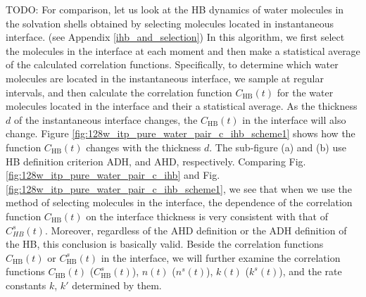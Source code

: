 TODO:
For comparison, let us look at the HB dynamics of water molecules in the solvation shells obtained by selecting molecules 
located in instantaneous interface. (see Appendix \ref{ihb_and_selection}) 
In this algorithm, we first select the molecules in the interface at each moment and then make a statistical
average of the calculated correlation functions.
Specifically, to determine which water molecules are located in the instantaneous interface, we sample at regular intervals, and then calculate 
the correlation function $C_\text{HB}(t)$ for the water molecules located in the interface and their a statistical average.
As the thickness $d$ of the instantaneous interface changes, the $C_\text{HB}(t)$ in the interface will also change. 
Figure \ref{fig:128w_itp_pure_water_pair_c_ihb_scheme1} shows how the function $C_\text{HB}(t)$ changes with the thickness $d$.
The sub-figure (a) and (b) use HB definition criterion ADH, and AHD, respectively.
Comparing Fig.\thinspace\ref{fig:128w_itp_pure_water_pair_c_ihb} and Fig.\thinspace\ref{fig:128w_itp_pure_water_pair_c_ihb_scheme1}, we see that
when we use the method of selecting molecules in the interface, the dependence of the correlation function $C_\text{HB}(t)$  
on the interface thickness is very consistent with that of $C^s_{HB}(t)$. Moreover, regardless of the AHD definition 
or the ADH definition of the HB, this conclusion is basically valid. Beside the correlation functions $C_\text{HB}(t)$ or $C^s_\text{HB}(t)$ in the interface, we will further examine the correlation 
functions $C_\text{HB}(t)$ ($C^s_\text{HB}(t)$), $n(t)$ ($n^s(t)$), $k(t)$ ($k^s(t)$), and the rate constants $k$, $k'$ determined by them.

